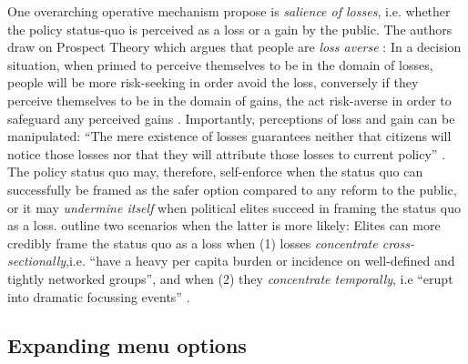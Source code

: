 \documentclass[11pt]{article}
\begin{document}
One overarching operative mechanism \textcite[][]{Jacobs2014} propose is \textit{salience of losses}, i.e. whether the policy status-quo is perceived as a loss or a gain by the public. The authors draw on Prospect Theory \parencite[][]{Kahnemann1979} which argues that people are \textit{loss averse} \parencite[][]{Tversky1991}: In a decision situation, when primed to perceive themselves to be in the domain of losses, people will be more risk-seeking in order avoid the loss, conversely if they perceive themselves to be in the domain of gains, the act risk-averse in order to safeguard any perceived gains \parencite[the latter phenomenon being know as the endowment effect, see][]{Kahnemann1991}. Importantly, perceptions of loss and gain can be manipulated: \enquote{The mere existence of losses guarantees neither that citizens will notice those losses nor that they will attribute those losses to current policy} \parencite[][p. 447]{Jacobs2014}. The policy status quo may, therefore, self-enforce when the status quo can successfully be framed as the safer option compared to any reform to the public, or it may \textit{undermine itself} when political elites succeed in framing the status quo as a loss. \textcite[][]{Jacobs2014} outline two scenarios when the latter is more likely: Elites can more credibly frame the status quo as a loss when (1) losses \textit{concentrate cross-sectionally},i.e. \enquote{have a heavy per capita burden or incidence on well-defined and tightly networked groups}, and when (2) they \textit{concentrate temporally}, i.e \enquote{erupt into dramatic focussing events} \parencite[][p. 448]{Jacobs2014}.

\subsection*{Expanding menu options}
\end{document}
